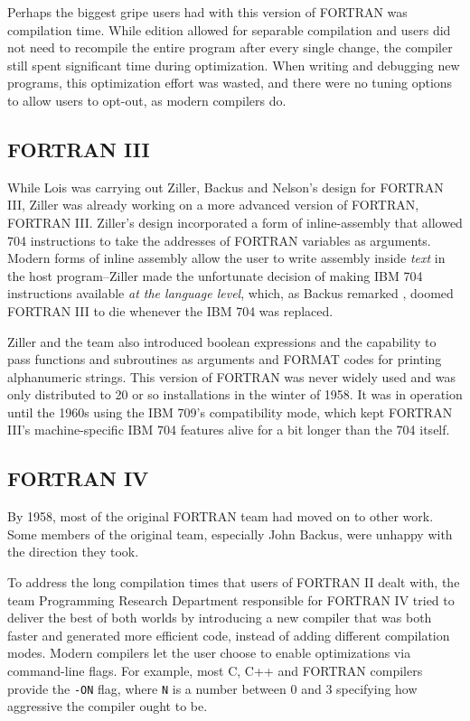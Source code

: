 Perhaps the biggest gripe users had with this version of FORTRAN was
compilation time.
While edition allowed for separable compilation and users did not need to recompile
the entire program after every single change, the compiler still spent significant time
during optimization.
When writing and debugging new programs, this optimization effort was wasted, and
there were no tuning options to allow users to opt-out, as modern compilers do.

\subsection{FORTRAN III}

While Lois was carrying out Ziller, Backus and Nelson's design for FORTRAN III,
Ziller was already working on a more advanced version of FORTRAN, FORTRAN III.
Ziller's design incorporated a form of \gls{inline-assembly} that allowed
704 instructions to take the addresses of FORTRAN variables as arguments.
Modern forms of inline assembly allow the user to write assembly inside \textit{text}
in the host program--Ziller made the unfortunate decision of making IBM 704
instructions available \textit{at the language level}, which, as Backus remarked
\cite{hopl_backus_history_of_fortran}, doomed FORTRAN III to die whenever the IBM 704
was replaced.

Ziller and the team also introduced boolean expressions and the capability to
pass functions and subroutines as arguments and FORMAT codes for printing
alphanumeric strings.
This version of FORTRAN was never widely used and was only distributed to
20 or so installations in the winter of 1958.
It was in operation until the 1960s using the IBM 709's compatibility mode,
which kept FORTRAN III's machine-specific IBM 704 features alive for a bit longer
than the 704 itself.

\subsection{FORTRAN IV}

By 1958, most of the original FORTRAN team had moved on to other work.
Some members of the original team, especially John Backus, were unhappy with
the direction they took.

To address the long compilation times that users of FORTRAN II dealt with,
the team Programming Research Department responsible for FORTRAN IV
tried to deliver the best of both worlds by introducing a new compiler
that was both faster and generated more efficient code, instead of adding
different compilation modes. Modern compilers let the user choose to enable
optimizations via command-line flags. For example, most C, C++ and FORTRAN compilers
provide the \texttt{-ON} flag, where \texttt{N} is a number
between 0 and 3 specifying how aggressive the compiler ought to be.

